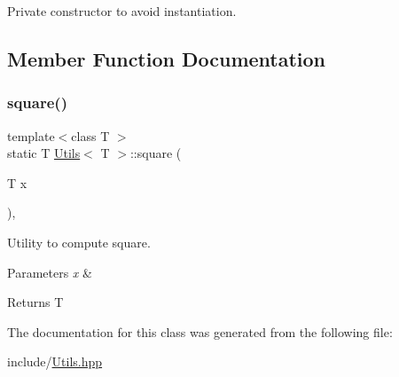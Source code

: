 Private constructor to avoid instantiation. 


\begin{DoxyCode}{0}

\end{DoxyCode}


\subsection{Member Function Documentation}
\mbox{\label{classUtils_abfc983311119a5d69174d8c082c00411}} 
\subsubsection{\texorpdfstring{square()}{square()}}
{\footnotesize\ttfamily template$<$class T $>$ \\
static T \mbox{\hyperlink{classUtils}{Utils}}$<$ T $>$\+::square (\begin{DoxyParamCaption}\item[{T}]{x }\end{DoxyParamCaption})\hspace{0.3cm}{\ttfamily [inline]}, {\ttfamily [static]}}



Utility to compute square. 


\begin{DoxyParams}{Parameters}
{\em x} & \\
\hline
\end{DoxyParams}
\begin{DoxyReturn}{Returns}
T 
\end{DoxyReturn}

\begin{DoxyCode}{0}

\end{DoxyCode}


The documentation for this class was generated from the following file\+:\begin{DoxyCompactItemize}
\item 
include/\mbox{\hyperlink{Utils_8hpp}{Utils.\+hpp}}\end{DoxyCompactItemize}
